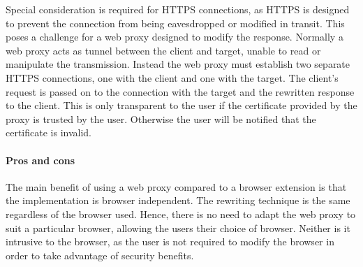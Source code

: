 \documentclass{llncs}
\newcommand{\todo}[1]{\colorbox{red}{\textcolor{white}{\sffamily\bfseries\scriptsize TODO}} \textcolor{red}{#1} \textcolor{red}{$\blacktriangleleft$}}
\begin{document}
Special consideration is required for HTTPS connections, as
%
HTTPS is designed to prevent the connection from being eavesdropped or modified in transit.
%
This poses a challenge for a web proxy designed %
to modify the response. 
Normally a web proxy acts as tunnel between the client and target, unable 
to read or manipulate the transmission. Instead the web proxy must establish 
two separate HTTPS connections, one with the client and one with the target. 
The client's request is passed on to the connection with the target
and the rewritten response to the client. This is only transparent 
to the user if the certificate provided by the proxy is trusted by the user. 
Otherwise the user will be notified that the certificate is invalid.


\vspace{-.4cm}
\paragraph{Pros and cons}
The main benefit of using a web proxy 
compared to a browser extension is that the implementation is browser independent. The 
rewriting technique is the same regardless of the browser used. Hence, there is no 
need to adapt the web proxy to suit a particular browser, allowing 
the users their choice of browser.
Neither is it intrusive to the browser, as the user is not required to modify the 
browser in order to take advantage of security benefits. 
\end{document}
